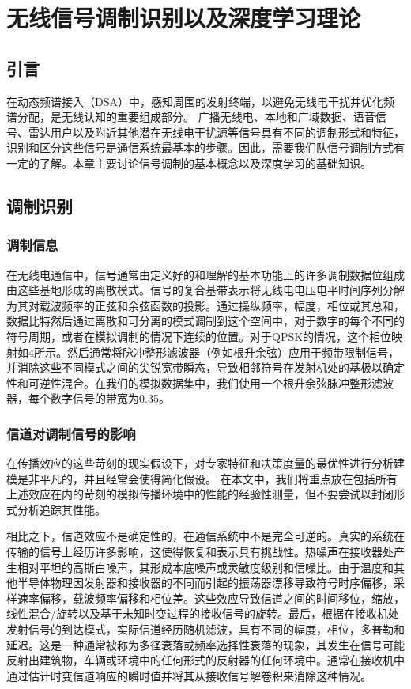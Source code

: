 
\chapter{无线信号调制识别以及深度学习理论}
\label{chap: mod_rec_deep_learning_theo}
\section{引言}
在动态频谱接入（DSA）中，感知周围的发射终端，以避免无线电干扰并优化频谱分配，是无线认知的重要组成部分。 广播无线电、本地和广域数据、语音信号、雷达用户以及附近其他潜在无线电干扰源等信号具有不同的调制形式和特征，识别和区分这些信号是通信系统最基本的步骤。因此，需要我们队信号调制方式有一定的了解。本章主要讨论信号调制的基本概念以及深度学习的基础知识。
\section{调制识别}


\subsection{调制信息}
在无线电通信中，信号通常由定义好的和理解的基本功能上的许多调制数据位组成由这些基地形成的离散模式。信号的复合基带表示将无线电电压电平时间序列分解为其对载波频率的正弦和余弦函数的投影。通过操纵频率，幅度，相位或其总和，数据比特然后通过离散和可分离的模式调制到这个空间中，对于数字的每个不同的符号周期，或者在模拟调制的情况下连续的位置。对于QPSK的情况，这个相位映射如4所示。然后通常将脉冲整形滤波器（例如根升余弦）应用于频带限制信号，并消除这些不同模式之间的尖锐宽带瞬态，导致相邻符号在发射机处的基极以确定性和可逆性混合。在我们的模拟数据集中，我们使用一个根升余弦脉冲整形滤波器，每个数字信号的带宽为0.35。\par

\subsection{信道对调制信号的影响}
在传播效应的这些苛刻的现实假设下，对专家特征和决策度量的最优性进行分析建模是非平凡的，并且经常会使得简化假设。 在本文中，我们将重点放在包括所有上述效应在内的苛刻的模拟传播环境中的性能的经验性测量，但不要尝试以封闭形式分析追踪其性能。\par

相比之下，信道效应不是确定性的，在通信系统中不是完全可逆的。真实的系统在传输的信号上经历许多影响，这使得恢复和表示具有挑战性。热噪声在接收器处产生相对平坦的高斯白噪声，其形成本底噪声或灵敏度级别和信噪比。由于温度和其他半导体物理因发射器和接收器的不同而引起的振荡器漂移导致符号时序偏移，采样速率偏移，载波频率偏移和相位差。这些效应导致信道之间的时间移位，缩放，线性混合/旋转以及基于未知时变过程的接收信号的旋转。最后，根据在接收机处发射信号的到达模式，实际信道经历随机滤波，具有不同的幅度，相位，多普勒和延迟。这是一种通常被称为多径衰落或频率选择性衰落的现象，其发生在信号可能反射出建筑物，车辆或环境中的任何形式的反射器的任何环境中。通常在接收机中通过估计时变信道响应的瞬时值并将其从接收信号解卷积来消除这种情况。\par


